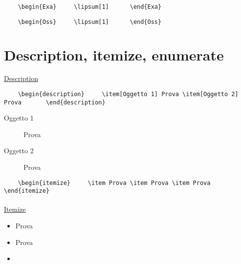 \begin{verbatim}
	\begin{Exa}		\lipsum[1]		\end{Exa}
\end{verbatim}\begin{Exa}\lipsum[8] \end{Exa}

\begin{verbatim}
	\begin{Oss}		\lipsum[1]		\end{Oss}
\end{verbatim}
\begin{Oss}\lipsum \end{Oss}
\section{Description, itemize, enumerate}
\paragraph*{} \underline{Description}
\begin{verbatim}
	\begin{description}		\item[Oggetto 1] Prova \item[Oggetto 2] Prova		\end{description}
\end{verbatim}
\begin{description}
	\item[Oggetto 1] Prova 
	\item[Oggetto 2] Prova 
\end{description}

\begin{verbatim}
	\begin{itemize}		\item Prova \item Prova \item Prova		\end{itemize}
\end{verbatim}
\paragraph*{} \underline{Itemize}
\begin{itemize}
	\item Prova 
	\item Prova
	\item \lipsum[9]
\end{itemize}

